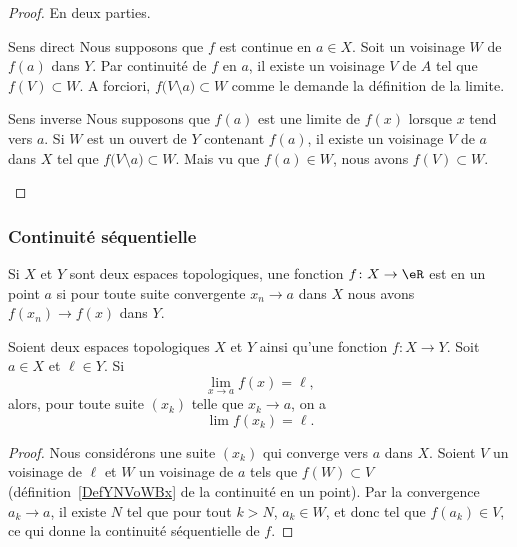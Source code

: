 \begin{proof}
    En deux parties.
    \begin{subproof}
        \item[Sens direct]
            Nous supposons que \( f\) est continue en \( a\in X\). Soit un voisinage \( W\) de \( f(a)\) dans \( Y\). Par continuité de \( f\) en \( a\), il existe un voisinage \( V\) de \( A\) tel que \( f(V)\subset W\). A forciori, \( f\big( V\setminus{{a}} \big)\subset W\) comme le demande la définition de la limite.
        \item[Sens inverse]
            Nous supposons que \( f(a)\) est une limite de \( f(x)\) lorsque \( x\) tend vers \( a\). Si \( W\) est un ouvert de \( Y\) contenant \( f(a)\), il existe un voisinage \( V\) de \( a\) dans \( X\) tel que \( f\big( V\setminus{{a}} \big)\subset W\). Mais vu que \( f(a)\in W\), nous avons \( f(V)\subset W\).
    \end{subproof}
\end{proof}

\subsubsection{Continuité séquentielle}

\begin{definition}  \label{DefENioICV}
    Si \( X\) et \( Y \) sont deux espaces topologiques, une fonction \( f\colon X\to \eR\) est  en un point \( a\) si pour toute suite convergente \( x_n\to a\) dans \( X\) nous avons \( f(x_n)\to f(x)\) dans \( Y\).
\end{definition}

\begin{proposition} \label{fContEstSeqCont}
  Soient deux espaces topologiques \( X\) et \( Y\) ainsi qu'une fonction \( f\colon X\to Y\). Soit \( a\in X\) et \( \ell\in Y\). Si
  \begin{equation}
    \lim_{x\to a} f(x)=\ell,
  \end{equation}
  alors, pour toute suite \( (x_k) \) telle que \( x_k \to a \), on a
  \begin{equation}
    \lim f(x_k)=\ell.
  \end{equation}
\end{proposition}

\begin{proof}
  Nous considérons une suite \( (x_k)\) qui converge vers \( a\) dans \( X\). Soient \( V\) un voisinage de \( \ell \) et \( W\) un voisinage de \( a\) tels que \( f(W)\subset V\) (définition~\ref{DefYNVoWBx} de la continuité en un point). Par la convergence \( a_k\to a\),  il existe \( N\) tel que pour tout \( k>N\), \( a_k\in W\), et donc tel que \( f(a_k)\in V\), ce qui donne la continuité séquentielle de \( f\).
\end{proof}

